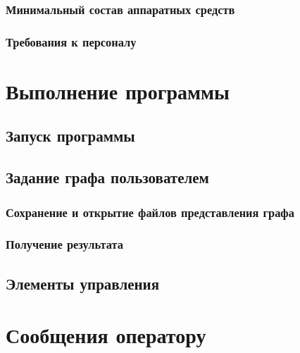 \documentclass[a4paper,12pt]{article}
\begin{document}
	\subsubsection{Минимальный состав аппаратных средств}
	\subsubsection{Требования к персоналу}
	
					\newpage 
	\section{Выполнение программы}
	\subsection{Запуск программы}
	\subsection{Задание графа пользователем}
	\subsubsection{Сохранение и открытие файлов представления графа}
	\subsubsection{Получение результата}
	\subsection{Элементы управления}
	
						\newpage
	\section{Сообщения оператору}

						\newpage
	\listRegistration
\end{document}
